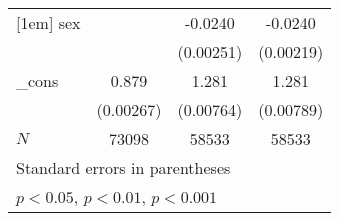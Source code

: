 \begin{table}[htbp]
\begin{tabular}{l*{3}{c}}
[1em]
sex         &                     &     -0.0240\sym{***}&     -0.0240\sym{***}\\
            &                     &   (0.00251)         &   (0.00219)         \\
[1em]
\_cons      &       0.879\sym{***}&       1.281\sym{***}&       1.281\sym{***}\\
            &   (0.00267)         &   (0.00764)         &   (0.00789)         \\
\hline
\(N\)       &       73098         &       58533         &       58533         \\
\hline\hline
\multicolumn{4}{l}{\footnotesize Standard errors in parentheses}\\
\multicolumn{4}{l}{\footnotesize \sym{*} \(p<0.05\), \sym{**} \(p<0.01\), \sym{***} \(p<0.001\)}\\
\end{tabular}
\end{table}

